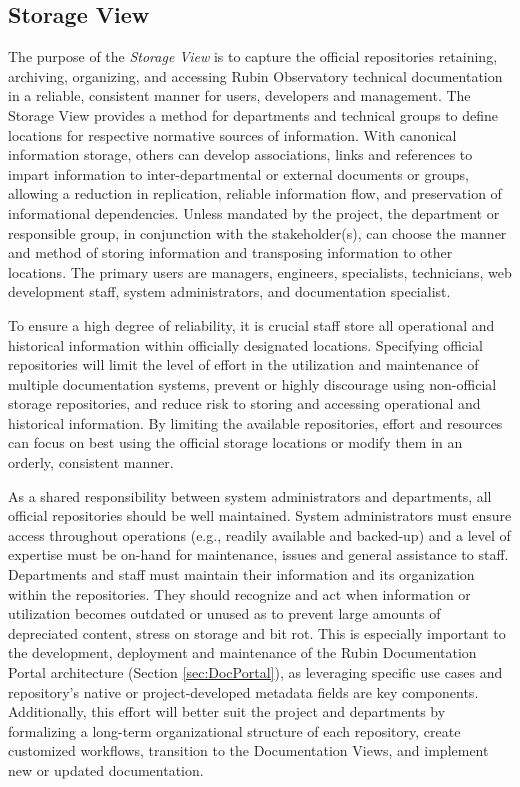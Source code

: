\subsection{Storage View}
\label{sec:storage-view}

The purpose of the \emph{Storage View} is to capture the official repositories retaining, archiving, organizing, and accessing Rubin Observatory technical documentation in a reliable, consistent manner for users, developers and management.
The Storage View provides a method for departments and technical groups to define locations for respective normative sources of information.
With canonical information storage, others can develop associations, links and references to impart information to inter-departmental or external documents or groups, allowing a reduction in replication, reliable information flow, and preservation of informational dependencies.
Unless mandated by the project, the department or responsible group, in conjunction with the stakeholder(s), can choose the manner and method of storing information and transposing information to other locations.
The primary users are managers, engineers, specialists, technicians, web development staff, system administrators, and documentation specialist.

To ensure a high degree of reliability, it is crucial staff store all operational and historical information within officially designated locations.
Specifying official repositories will limit the level of effort in the utilization and maintenance of multiple documentation systems, prevent or highly discourage using non-official storage repositories, and reduce risk to storing and accessing operational and historical information.
By limiting the available repositories, effort and resources can focus on best using the official storage locations or modify them in an orderly, consistent manner.

As a shared responsibility between system administrators and departments, all official repositories should be well maintained.
System administrators must ensure access throughout operations (e.g., readily available and backed-up) and a level of expertise must be on-hand for maintenance, issues and general assistance to staff.
Departments and staff must maintain their information and its organization within the repositories.
They should recognize and act when information or utilization becomes outdated or unused as to prevent large amounts of depreciated content, stress on storage and bit rot.
This is especially important to the development, deployment and maintenance of the Rubin Documentation Portal architecture (Section \ref{sec:DocPortal}), as leveraging specific use cases and repository's native or project-developed metadata fields are key components.
Additionally, this effort will better suit the project and departments by formalizing a long-term organizational structure of each repository, create customized workflows, transition to the Documentation Views, and implement new or updated documentation.

